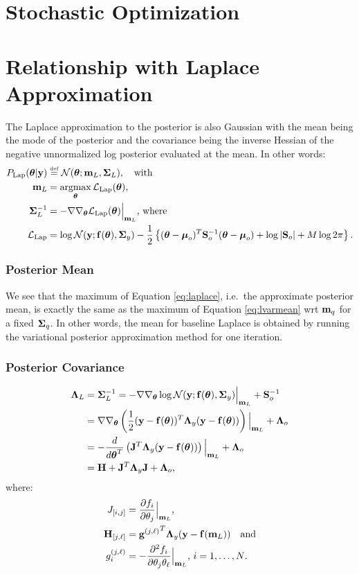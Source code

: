 \section{Stochastic Optimization}
%
%
\section{Relationship with Laplace Approximation}
%
The Laplace approximation to the posterior is also Gaussian with the mean being  the mode of the 
posterior and the covariance being the inverse Hessian of the negative unnormalized log posterior evaluated at 
the mean. In 
other words:
\begin{align}
	P_{\text{Lap}}(\boldsymbol{ \theta } | \mathbf{y}) &\stackrel{\text{\tiny def}}{=} \mathcal{N}(\boldsymbol{ \theta }; \mathbf{m}_{L}, \mathbf{\Sigma}_{L}), \quad \text{with} \\
	\mathbf{m}_{L} &=  \operatorname*{argmax}_{\boldsymbol{ \theta }} \mathcal{L}_{\text{Lap}}(\boldsymbol{ \theta })\text{,} \\
	 \mathbf{\Sigma}_{L}^{-1} &= - \nabla\nabla_{\boldsymbol{ \theta }}  \mathcal{L}_{\text{Lap}}(\boldsymbol{ \theta }) \Big|_{\mathbf{m}_{L}}
	\text{, where} \\
	\label{eq:laplace}
	\mathcal{L}_{\text{Lap}}  &= \log \mathcal{N}(\mathbf{y}; \mathbf{f}(\boldsymbol{ \theta }), \mathbf{\Sigma}_{y}) - \frac{1}{2} \left\{ (\boldsymbol{ \theta } - \boldsymbol{ \mu }_{o})^{T} \mathbf{S}_{o}^{-1}  (\boldsymbol{ \theta } - \boldsymbol{ \mu }_{o} ) 
		+ \log \left\lvert\mathbf{S}_{o}\right\rvert + M  \log 2\pi\right\} \text{.}
\end{align}
%
\subsubsection*{Posterior Mean}
We see that the maximum of Equation \eqref{eq:laplace}, i.e.~the approximate  posterior mean, is exactly the same as the maximum 
of Equation  \eqref{eq:lvarmean} wrt $\mathbf{m}_{q}$ for a fixed $\mathbf{\Sigma}_{q}$. In other words, the mean for baseline Laplace is obtained by running 
the  variational posterior approximation method for one iteration.
%
\subsubsection*{Posterior Covariance}
\begin{align}
	\mathbf{\Lambda}_{L} &= \mathbf{\Sigma}_{L}^{-1} = - \nabla\nabla_{\boldsymbol{ \theta }} \log \mathcal{N}(\mathbf{y}; \mathbf{f}(\boldsymbol{ \theta }), \mathbf{\Sigma}_{y}) \Big|_{\mathbf{m}_{L}} + \mathbf{S}_{o}^{-1} \\
	&= \nabla\nabla_{\boldsymbol{ \theta }} \left(\frac{1}{2} ( \mathbf{y} - \mathbf{f}(\boldsymbol{ \theta }))^{T} \mathbf{\Lambda}_{y}  (\mathbf{y} - \mathbf{f}(\boldsymbol{ \theta }) )  \right) \Big|_{\mathbf{m}_{L}} + \mathbf{\Lambda}_{o} \\
	&= - \frac{d{}}{d{\boldsymbol{ \theta }^{T}}} \left(\mathbf{J}^{T} \mathbf{\Lambda}_{y} (\mathbf{y} - \mathbf{f}(\boldsymbol{ \theta }) ) \right) \Big|_{\mathbf{m}_{L}} + \mathbf{\Lambda}_{o} \\
	&=  \mathbf{H} + \mathbf{J}^{T} \mathbf{\Lambda}_{y} \mathbf{J}  + \mathbf{\Lambda}_{o} \text{,} 
\end{align}
where:
\begin{align}
	J_{[i,j]}          &= \frac{\partial{f_{i}}}{\partial{\theta_{j}}} \Big|_{\mathbf{m}_{L}} \text{,} \\
 \mathbf{H}_{[j,\ell]} &= {\mathbf{g}^{(j,\ell)}}^{T} \mathbf{\Lambda}_{y} (\mathbf{y} - \mathbf{f}(\mathbf{m}_{L}))	\quad \text{and} \\
	{g}^{(j,\ell)}_{i} &=  - \frac{\partial^{2}{f_{i}}}{\partial{\theta_{j}\theta_{\ell}}} \Big|_{\mathbf{m}_{L}} \text{, } i=1, \ldots, N \text{.}
\end{align}



